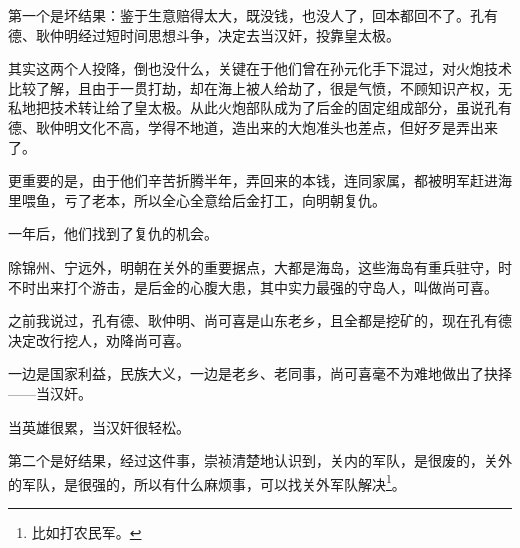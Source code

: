 \begin{multicols}{\theparacolNo}
		第一个是坏结果：鉴于生意赔得太大，既没钱，也没人了，回本都回不了。孔有德、耿仲明经过短时间思想斗争，决定去当汉奸，投靠皇太极。

		其实这两个人投降，倒也没什么，关键在于他们曾在孙元化手下混过，对火炮技术比较了解，且由于一贯打劫，却在海上被人给劫了，很是气愤，不顾知识产权，无私地把技术转让给了皇太极。从此火炮部队成为了后金的固定组成部分，虽说孔有德、耿仲明文化不高，学得不地道，造出来的大炮准头也差点，但好歹是弄出来了。

		更重要的是，由于他们辛苦折腾半年，弄回来的本钱，连同家属，都被明军赶进海里喂鱼，亏了老本，所以全心全意给后金打工，向明朝复仇。

		一年后，他们找到了复仇的机会。

		除锦州、宁远外，明朝在关外的重要据点，大都是海岛，这些海岛有重兵驻守，时不时出来打个游击，是后金的心腹大患，其中实力最强的守岛人，叫做尚可喜。

		之前我说过，孔有德、耿仲明、尚可喜是山东老乡，且全都是挖矿的，现在孔有德决定改行挖人，劝降尚可喜。

		一边是国家利益，民族大义，一边是老乡、老同事，尚可喜毫不为难地做出了抉择——当汉奸。

		当英雄很累，当汉奸很轻松。

		第二个是好结果，经过这件事，崇祯清楚地认识到，关内的军队，是很废的，关外的军队，是很强的，所以有什么麻烦事，可以找关外军队解决\footnote{比如打农民军。}。
		\ifnum{}
	\end{multicols}
\fi
\newpage
